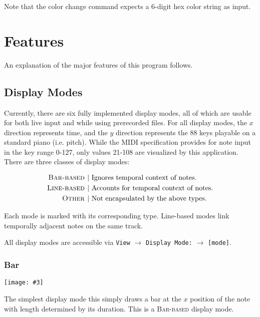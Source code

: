 \documentclass[english]{article}
\makeatletter
\newenvironment{restoretext}%
    {\@parboxrestore%
     \begin{adjustwidth}{}{\leftmargin}%
    }{\end{adjustwidth}
     }
\def\rcbegin{\begin{restoretext}\centering}
\def\rcend{\end{restoretext}}
\newcommand{\rcgnc}[3][]{
  \rcbegin
    \texttt{[image: \#3]}
  \rcend
  \vspace{1em}
}
\providecommand{\mi}[1]{\texttt{#1}}
\makeatother
\begin{document}
\vspace{1em}

Note that the color change command expects a 6-digit hex color string as input.

\section{Features}

An explanation of the major features of this program follows.

\subsection{Display Modes}

Currently, there are six fully implemented display modes, all of which are usable for both live input and
while using prerecorded files. For all display modes, the $x$ direction represents time, and the $y$ direction
represents the 88 keys playable on a standard piano (i.e. pitch). While the MIDI specification provides for note 
input in the key range
0-127, only values 21-108 are visualized by this application. There are three classes of display modes:

\rcbegin
\begin{align*}
  \textsc{Bar-based }  | & \text{ Ignores temporal context of notes.}\\
  \textsc{Line-based } | & \text{ Accounts for temporal context of notes.}\\
  \textsc{Other }      | & \text{ Not encapsulated by the above types.}\\
\end{align*}
\rcend

Each mode is marked with its corresponding type. Line-based modes link temporally adjacent notes on the same track.

All display modes are accessible via 
\mi{View} $\rightarrow$ \mi{Display Mode:} $\rightarrow$ \mi{[mode]}.

\newpage

\subsubsection{Bar}

\rcgnc{0.86}{image/bar.png}

The simplest display mode \textendash{} this simply draws a bar at the $x$ position of the note with length
determined by its duration.
This is a \textsc{Bar-based} display mode.
\end{document}
